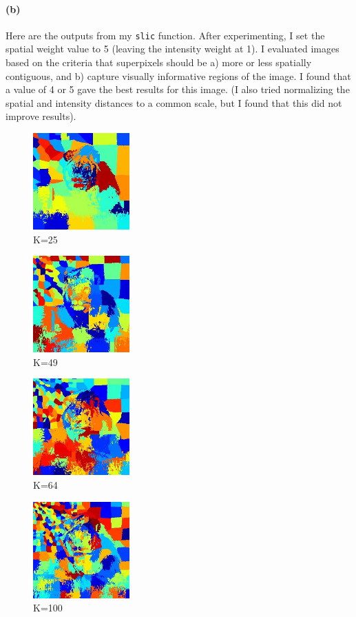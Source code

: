 \documentclass{article}
\newcommand{\spart}[1]{\paragraph{(#1)}}
\begin{document}
\spart{b} Here are the outputs from my \texttt{slic} function. After experimenting, I set the spatial weight value to 5 (leaving the intensity weight at 1). I evaluated images based on the criteria that superpixels should be a) more or less spatially contiguous, and b) capture visually informative regions of the image. I found that a value of 4 or 5 gave the best results for this image. (I also tried normalizing the spatial and intensity distances to a common scale, but I found that this did not improve results).

\begin{figure}[!h]
	\centering
	\includegraphics[height=10em]{code/outputs/prob1b_25.jpg}
	\caption{K=25}
\end{figure}

\begin{figure}[!h]
	\centering
	\includegraphics[height=10em]{code/outputs/prob1b_49.jpg}
	\caption{K=49}
\end{figure}

\begin{figure}[!h]
	\centering
	\includegraphics[height=10em]{code/outputs/prob1b_64.jpg}
	\caption{K=64}
\end{figure}

\begin{figure}[!h]
	\centering
	\includegraphics[height=10em]{code/outputs/prob1b_100.jpg}
	\caption{K=100}
\end{figure}
\end{document}
